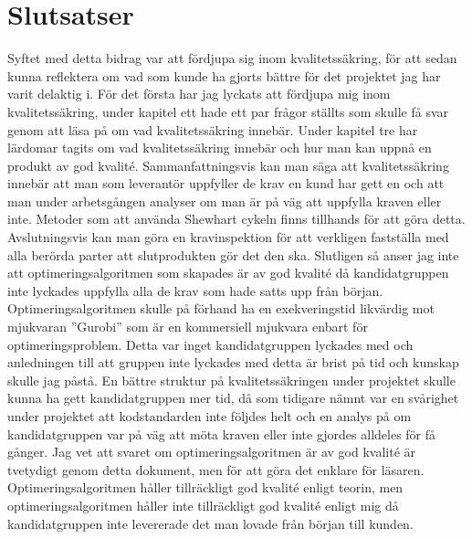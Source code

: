 \section{Slutsatser}
Syftet med detta bidrag var att fördjupa sig inom kvalitetssäkring, för att sedan kunna reflektera om vad som kunde ha gjorts bättre för det projektet jag har varit delaktig i.
\newline
\newline
För det första har jag lyckats att fördjupa mig inom kvalitetssäkring, under kapitel ett hade ett par frågor ställts som skulle få svar genom att läsa på om vad kvalitetssäkring innebär. Under kapitel tre har lärdomar tagits om vad kvalitetssäkring innebär och hur man kan uppnå en produkt av god kvalité. Sammanfattningsvis kan man säga att kvalitetssäkring innebär att man som leverantör uppfyller de krav en kund har gett en och att man under arbetsgången analyser om man är på väg att uppfylla kraven eller inte. Metoder som att använda Shewhart cykeln finns tillhands för att göra detta. Avslutningsvis kan man göra en kravinspektion för att verkligen fastställa med alla berörda parter att slutprodukten gör det den ska.
\newline
\newline
Slutligen så anser jag inte att optimeringsalgoritmen som skapades är av god kvalité då kandidatgruppen inte lyckades uppfylla alla de krav som hade satts upp från början. Optimeringsalgoritmen skulle på förhand ha en exekveringstid likvärdig mot mjukvaran ''Gurobi'' som är en kommersiell mjukvara enbart för optimeringsproblem. Detta var inget kandidatgruppen lyckades med och anledningen till att gruppen inte lyckades med detta är brist på tid och kunskap skulle jag påstå. En bättre struktur på kvalitetssäkringen under projektet skulle kunna ha gett kandidatgruppen mer tid, då som tidigare nämnt var en svårighet under projektet att kodstandarden inte följdes helt och en analys på om kandidatgruppen var på väg att möta kraven eller inte gjordes alldeles för få gånger. Jag vet att svaret om optimeringsalgoritmen är av god kvalité är tvetydigt genom detta dokument, men för att göra det enklare för läsaren. Optimeringsalgoritmen håller tillräckligt god kvalité enligt teorin, men optimeringsalgoritmen håller inte tillräckligt god kvalité enligt mig då kandidatgruppen inte levererade det man lovade från början till kunden.
